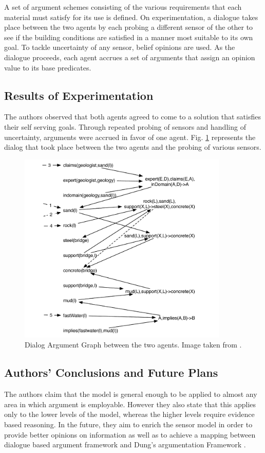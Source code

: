 \documentclass[UTF8]{article}
\begin{document}
A set of argument schemes consisting of the various requirements that each material must satisfy for its use is defined. On experimentation, a dialogue takes place 
between the two agents by each probing a different sensor of the other to see if the building conditions are satisfied in a manner most suitable to its 
own goal. To tackle uncertainty of any sensor, belief opinions are used. As the dialogue proceeds, each agent accrues a set of arguments that assign an opinion 
value to its base predicates.

\subsection{Results of Experimentation}
The authors observed that both agents agreed to come to a solution that satisfies their self serving goals. Through repeated probing of sensors and 
handling of uncertainty, arguments were accrued in favor of one agent. Fig. \ref{fig:fig1} represents the dialog that took place between the two agents and the probing of various sensors.

\begin{figure}
  \centering
  \includegraphics[width=10cm]{dialog}
  \caption{Dialog Argument Graph between the two agents. Image taken from \cite{OREN2007838}.}
  \label{fig:fig1}
\end{figure}

\subsection{Authors' Conclusions and Future Plans}
The authors claim that the model is general enough to be applied to almost any area in which argument is employable. However they also state that 
this applies only to the lower levels of the model, whereas the higher levels require evidence based reasoning. In the future, they aim to enrich the sensor model 
in order to provide better opinions on information as well as to achieve a mapping between dialogue based argument framework and Dung's argumentation Framework \cite{DUNG1995321}.
\end{document}
